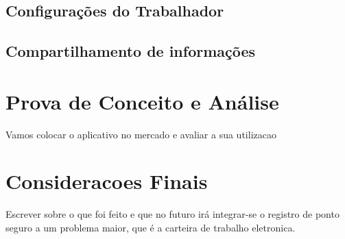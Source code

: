 \documentclass[12pt,openright,twoside,a4paper,english, brazil]{abntex2} %
\begin{document}
\section{Configurações do Trabalhador}

\section{Compartilhamento de informações}





\chapter{Prova de Conceito e Análise}

Vamos colocar o aplicativo no mercado e avaliar a sua utilizacao





\chapter{Consideracoes Finais}

Escrever sobre o que foi feito e que no futuro irá integrar-se o registro de ponto seguro a um problema maior, que é a carteira de trabalho eletronica.




\apendices
\end{document}
